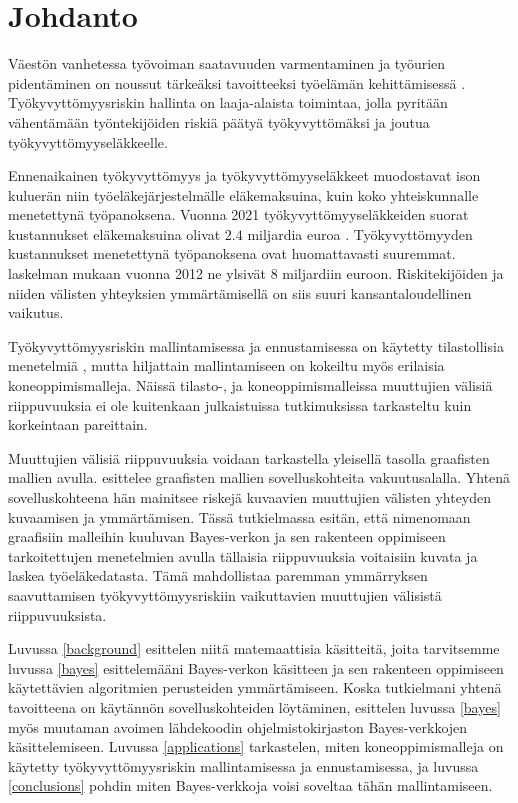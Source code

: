 \chapter{Johdanto\label{intro}} 

Väestön vanhetessa työvoiman saatavuuden varmentaminen ja työurien pidentäminen on noussut tärkeäksi tavoitteeksi työelämän kehittämisessä \citep{noauthor_paaministeri_2019}. Työkyvyttömyysriskin hallinta on laaja-alaista toimintaa, jolla pyritään vähentämään työntekijöiden riskiä päätyä työkyvyttömäksi ja joutua työkyvyttömyyseläkkeelle. 

Ennenaikainen työkyvyttömyys ja työkyvyttömyyseläkkeet muodostavat ison kuluerän niin työeläkejärjestelmälle eläkemaksuina, kuin koko yhteiskunnalle menetettynä työpanoksena. Vuonna 2021 työkyvyttömyyseläkkeiden suorat kustannukset eläkemaksuina olivat $2.4$ miljardia euroa \citep{etk_show_me_the_money}. Työkyvyttömyyden kustannukset menetettynä työpanoksena ovat huomattavasti suuremmat. \citet{rissanen_menetetyn_2014} laskelman mukaan vuonna 2012 ne ylsivät $8$ miljardiin euroon. Riskitekijöiden ja niiden välisten yhteyksien ymmärtämisellä on siis suuri kansantaloudellinen vaikutus. 

Työkyvyttömyysriskin mallintamisessa ja ennustamisessa on käytetty tilastollisia menetelmiä \citep{gross_machine_2020}, mutta hiljattain mallintamiseen on kokeiltu myös erilaisia koneoppimismalleja. Näissä tilasto-, ja koneoppimismalleissa muuttujien välisiä riippuvuuksia ei ole kuitenkaan julkaistuissa tutkimuksissa tarkasteltu kuin korkeintaan pareittain. 

Muuttujien välisiä riippuvuuksia voidaan tarkastella yleisellä tasolla graafisten mallien avulla. \citet{ramsahai_connecting_2020} esittelee graafisten mallien sovelluskohteita vakuutusalalla. Yhtenä sovelluskohteena hän mainitsee riskejä kuvaavien muuttujien välisten yhteyden kuvaamisen ja ymmärtämisen. Tässä tutkielmassa esitän, että nimenomaan graafisiin malleihin kuuluvan Bayes-verkon ja sen rakenteen oppimiseen tarkoitettujen menetelmien avulla tällaisia riippuvuuksia voitaisiin kuvata ja laskea työeläkedatasta. Tämä mahdollistaa paremman ymmärryksen saavuttamisen työkyvyttömyysriskiin vaikuttavien muuttujien välisistä riippuvuuksista. 

Luvussa \ref{background} esittelen niitä matemaattisia käsitteitä, joita tarvitsemme luvussa \ref{bayes} esittelemääni Bayes-verkon käsitteen ja sen rakenteen oppimiseen käytettävien algoritmien perusteiden ymmärtämiseen. Koska tutkielmani yhtenä tavoitteena on käytännön sovelluskohteiden löytäminen, esittelen luvussa \ref{bayes} myös muutaman avoimen lähdekoodin ohjelmistokirjaston Bayes-verkkojen käsittelemiseen. Luvussa \ref{applications} tarkastelen, miten koneoppimismalleja on käytetty työkyvyttömyysriskin mallintamisessa ja ennustamisessa, ja luvussa \ref{conclusions} pohdin miten Bayes-verkkoja voisi soveltaa tähän mallintamiseen. 